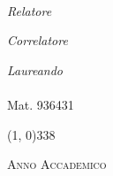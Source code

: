 \begin{titlepage}
\begin{center}
\vspace{8pt} 

\begin{large}
\textsl{\myDegree}\\
\end{large}

\vspace{30pt} 

\begin{large}
\begin{flushleft}
\textit{Relatore}\\ 
\vspace{3pt} 
\profTitle\:\myProf
\end{flushleft}

\begin{flushleft}
	\textit{Correlatore}\\ 
	\vspace{3pt} 
	\correlatoreTitle\:\myCorrelatore
\end{flushleft}

\begin{flushright}
\textit{Laureando}\\ 
\vspace{3pt}  
\myName\\
Mat. 936431
\end{flushright}
\end{large}

\vspace{40pt}

\line(1, 0){338} \\
\begin{normalsize}
\textsc{Anno Accademico \myAA}
\end{normalsize}

\end{center}
\end{titlepage} 